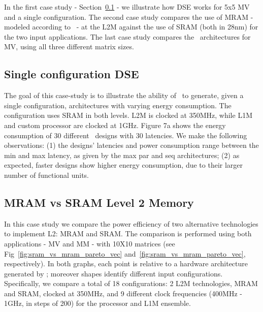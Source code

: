 In the first case study - Section~\ref{ssec:exp_single} - we illustrate how DSE works for 5x5 MV and a single configuration. The second case study compares the use of MRAM - modeled according to~\cite{8310393} - at the L2M against the use of SRAM (both in 28nm) for the two input applications. The last case study compares the \frameworkname~architectures for MV, using all three different matrix sizes.

\subsection{Single configuration DSE}
\label{ssec:exp_single}

The goal of this case-study is to illustrate the ability of \frameworkname~to generate, given a single configuration, architectures with varying energy consumption. The configuration uses SRAM in both levels. L2M is clocked at 350MHz, while L1M and custom processor are clocked at 1GHz. Figure 7a shows the energy consumption of 30 different \frameworkname~designs with 30 latencies. We make the following observations: (1) the designs' latencies and power consumption range between the min and max latency, as given by the max par and seq architectures; (2) as expected, faster designs show higher energy consumption, due to their larger number of functional units.



\subsection{MRAM vs SRAM Level 2 Memory}
\label{ssec:case_study2}

In this case study we compare the power efficiency of two alternative technologies to implement L2: MRAM and SRAM. 
The comparison is performed using both applications - MV and MM - with 10X10 matrices (see Fig~\ref{fig:sram_vs_mram_pareto_vec} and~\ref{fig:sram_vs_mram_pareto_vec}, respectively). In both graphs, each point is relative to a hardware architecture generated by \frameworkname; moreover shapes identify different input configurations. Specifically, we compare a total of 18 configurations: 2 L2M technologies, MRAM and SRAM, clocked at 350MHz, and 9 different clock frequencies (400MHz - 1GHz, in steps of 200) for the processor and L1M ensemble. 


